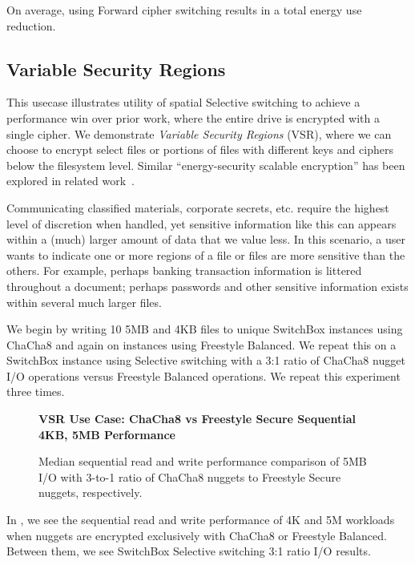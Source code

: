 On average, using Forward cipher switching results in a  total energy
use reduction.

\subsection{Variable Security Regions}

This usecase illustrates utility of spatial Selective switching to achieve a
performance win over prior work, where the entire drive is encrypted with a
single cipher. We demonstrate \emph{Variable Security Regions} (VSR), where we
can choose to encrypt select files or portions of files with different keys and
ciphers below the filesystem level. Similar ``energy-security scalable
encryption'' has been explored in related work~\cite{ScalableEncryption}.

Communicating classified materials, corporate secrets, etc. require the highest
level of discretion when handled, yet sensitive information like this can
appears within a (much) larger amount of data that we value less. In this
scenario, a user wants to indicate one or more regions of a file or files are
more sensitive than the others. For example, perhaps banking transaction
information is littered throughout a document; perhaps passwords and other
sensitive information exists within several much larger files.

We begin by writing 10 5MB and 4KB files to unique SwitchBox instances using
ChaCha8 and again on instances using Freestyle Balanced. We repeat this on a
SwitchBox instance using Selective switching with a 3:1 ratio of ChaCha8 nugget
I/O operations versus Freestyle Balanced operations. We repeat this experiment
three times.

\begin{figure}[ht] \textbf{VSR Use Case: ChaCha8 vs Freestyle Secure Sequential
4KB, 5MB Performance}\par\medskip
   \centering
   {} \caption{Median sequential read and
   write performance comparison of 5MB I/O with 3-to-1 ratio of ChaCha8 nuggets
   to Freestyle Secure nuggets, respectively.}
  \label{fig:usecase-vsr-bar}
\end{figure}

In , we see the sequential read and write performance of
4K and 5M workloads when nuggets are encrypted exclusively with ChaCha8 or
Freestyle Balanced. Between them, we see SwitchBox Selective switching 3:1 ratio
I/O results.

